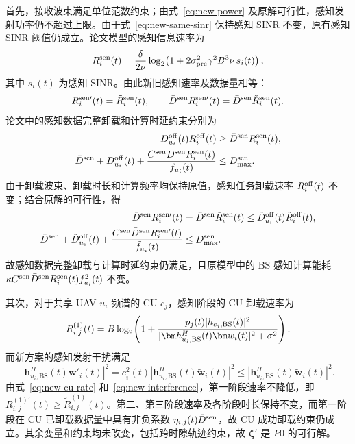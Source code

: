 首先，接收波束满足单位范数约束；由式~\eqref{eq:new-power} 及原解可行性，感知发射功率仍不超过上限。由于式~\eqref{eq:new-same-sinr} 保持感知 SINR 不变，原有感知 SINR 阈值仍成立。论文模型的感知信息速率为
\begin{equation}\label{eq:new-rate-formula}
R_i^{\rm sen}(t)=\frac{\delta}{2\nu}\log_2\!\left(1+2\sigma_{\rm pre}^2\gamma^2B^3\nu\,s_i(t)\right),
\end{equation}
其中 $s_i(t)$ 为感知 SINR。由此新旧感知速率及数据量相等：
\begin{equation}\label{eq:new-same-rate}
R_i^{\rm sen\prime}(t)=\tilde R_i^{\rm sen}(t),\qquad
\bar D^{\rm sen}R_i^{\rm sen\prime}(t)=\bar D^{\rm sen}\tilde R_i^{\rm sen}(t).
\end{equation}
论文中的感知数据完整卸载和计算时延约束分别为
\begin{align}\label{eq:new-model-off}
D_{u_i}^{\rm off}(t) R_i^{\rm off}(t)&\ge\bar D^{\rm sen}R_i^{\rm sen}(t),\\
\bar D^{\rm sen}+D_{u_i}^{\rm off}(t)+\frac{C^{\rm sen}\bar D^{\rm sen}R_i^{\rm sen}(t)}{f_{u_i}(t)}&\le D_{\max}^{\rm sen}.\label{eq:new-model-delay}
\end{align}
由于卸载波束、卸载时长和计算频率均保持原值，感知任务卸载速率 $R_i^{\rm off}(t)$ 不变；结合原解的可行性，得
\begin{align}
\bar D^{\rm sen}R_i^{\rm sen\prime}(t)&=\bar D^{\rm sen}\tilde R_i^{\rm sen}(t)\le\tilde D_{u_i}^{\rm off}(t)\tilde R_i^{\rm off}(t),\label{eq:new-off}\\
\bar D^{\rm sen}+\tilde D_{u_i}^{\rm off}(t)+\frac{C^{\rm sen}\bar D^{\rm sen}R_i^{\rm sen\prime}(t)}{\tilde f_{u_i}(t)}&\le D_{\max}^{\rm sen}.\label{eq:new-delay}
\end{align}
故感知数据完整卸载与计算时延约束仍满足，且原模型中的 BS 感知计算能耗 $\kappa C^{\rm sen}\bar D^{\rm sen}R_i^{\rm sen}(t) f_{u_i}^2(t)$ 不变。

其次，对于共享 UAV $u_i$ 频谱的 CU $c_j$，感知阶段的 CU 卸载速率为
\begin{equation}\label{eq:new-cu-rate}
R_{i,j}^{(1)}(t)=B\log_2\!\left(1+\frac{p_j(t)|h_{c_j,\rm BS}(t)|^2}{|\bm h_{u_i,\rm BS}^H(t)\bm w_i(t)|^2+\sigma^2}\right).
\end{equation}
而新方案的感知发射干扰满足
\begin{equation}\label{eq:new-interference}
\left|\bm h_{u_i,\mathrm{BS}}^H(t)\bm w'_i(t)\right|^2=c_i^2(t)\left|\bm h_{u_i,\mathrm{BS}}^H(t)\tilde{\bm w}_i(t)\right|^2\le\left|\bm h_{u_i,\mathrm{BS}}^H(t)\tilde{\bm w}_i(t)\right|^2.
\end{equation}
由式~\eqref{eq:new-cu-rate} 和~\eqref{eq:new-interference}，第一阶段速率不降低，即 $R_{i,j}^{(1)\prime}(t)\ge\tilde R_{i,j}^{(1)}(t)$。第二、第三阶段速率及各阶段时长保持不变，而第一阶段在 CU 已卸载数据量中具有非负系数 $\eta_{i,j}(t)\bar D^{\rm sen}$，故 CU 成功卸载约束仍成立。其余变量和约束均未改变，包括跨时隙轨迹约束，故 $\bm\zeta'$ 是 $P0$ 的可行解。

